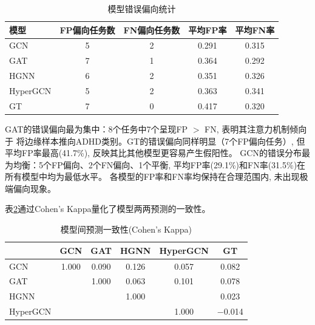 \documentclass[12pt,a4paper,heading=true,fontset=windows]{ctexart}
\newcommand{\kw}[1]{{\heiti #1}}
\begin{document}
\begin{table}[H]
    \centering
    \caption{模型错误偏向统计}
    \label{tab:error_bias}
    \small
    \begin{tabular}{lcccc}
        \toprule
        \textbf{模型} & \textbf{FP偏向任务数} & \textbf{FN偏向任务数} & \textbf{平均FP率} & \textbf{平均FN率} \\
        \midrule
        GCN         & 5                & 2                & 0.291          & 0.315          \\
        GAT         & 7                & 1                & 0.364          & 0.292          \\
        HGNN        & 6                & 2                & 0.351          & 0.326          \\
        HyperGCN    & 5                & 2                & 0.363          & 0.341          \\
        GT          & 7                & 0                & 0.417          & 0.320          \\
        \bottomrule
    \end{tabular}
\end{table}

GAT的错误偏向最为集中：8个任务中7个呈现FP $>$ FN, 表明其注意力机制倾向于
将边缘样本推向ADHD类别。GT的错误偏向同样明显（7个FP偏向任务）,
但平均FP率最高(41.7\%), 反映其比其他模型更容易产生假阳性。
GCN的错误分布最为均衡：5个FP偏向、2个FN偏向、1个平衡,
平均FP率(29.1\%)和FN率(31.5\%)在所有模型中均为最低水平。
各模型的FP率和FN率均保持在合理范围内, 未出现极端偏向现象。

表\ref{tab:agreement}通过Cohen's Kappa量化了模型两两预测的一致性。

\begin{table}[H]
    \centering
    \caption{模型间预测一致性(Cohen's Kappa)}
    \label{tab:agreement}
    \small
    \begin{tabular}{lccccc}
        \toprule
                 & \textbf{GCN} & \textbf{GAT} & \textbf{HGNN} & \textbf{HyperGCN} & \textbf{GT} \\
        \midrule
        GCN      & 1.000        & 0.090        & 0.126         & 0.057             & 0.082       \\
        GAT      &              & 1.000        & 0.063         & 0.101             & 0.078       \\
        HGNN     &              &              & 1.000         & \kw{0.001}        & 0.023       \\
        HyperGCN &              &              &               & 1.000             & $-$0.014    \\
        \bottomrule
    \end{tabular}
\end{table}
\end{document}
